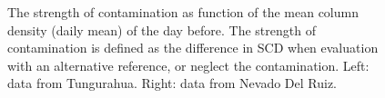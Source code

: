 \begin{figure}
	\caption{The strength of contamination as function of the mean  column density (daily mean) of the day before. The strength of contamination is defined as the difference in  SCD  when evaluation with an alternative reference, or neglect the contamination. Left: data from Tungurahua. Right: data from Nevado Del Ruiz. }
	\label{fig:contaminationdependencyso2}
\end{figure}